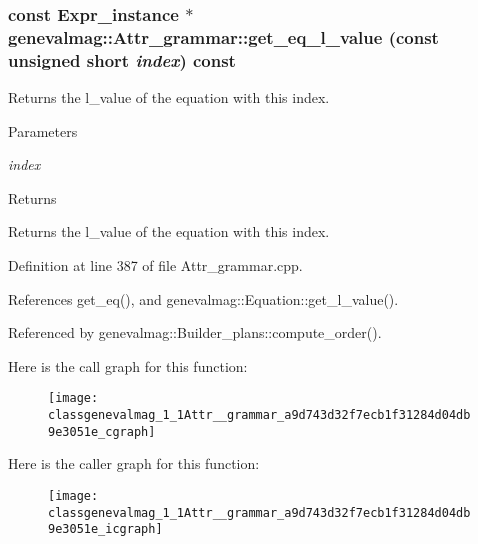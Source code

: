 \hypertarget{classgenevalmag_1_1Attr__grammar_a9d743d32f7ecb1f31284d04db9e3051e}{
\subsubsection[{get\_\-eq\_\-l\_\-value}]{\setlength{\rightskip}{0pt plus 5cm}const {\bf Expr\_\-instance} $\ast$ genevalmag::Attr\_\-grammar::get\_\-eq\_\-l\_\-value (const unsigned short {\em index}) const}}
\label{classgenevalmag_1_1Attr__grammar_a9d743d32f7ecb1f31284d04db9e3051e}
Returns the l\_\-value of the equation with this index. 
\begin{DoxyParams}{Parameters}
\item[{\em index}]\end{DoxyParams}
\begin{DoxyReturn}{Returns}

\end{DoxyReturn}
Returns the l\_\-value of the equation with this index. 

Definition at line 387 of file Attr\_\-grammar.cpp.



References get\_\-eq(), and genevalmag::Equation::get\_\-l\_\-value().



Referenced by genevalmag::Builder\_\-plans::compute\_\-order().



Here is the call graph for this function:\nopagebreak
\begin{figure}[H]
\begin{center}
\leavevmode
\texttt{[image: classgenevalmag\_1\_1Attr\_\_grammar\_a9d743d32f7ecb1f31284d04db9e3051e\_cgraph]}
\end{center}
\end{figure}




Here is the caller graph for this function:\nopagebreak
\begin{figure}[H]
\begin{center}
\leavevmode
\texttt{[image: classgenevalmag\_1\_1Attr\_\_grammar\_a9d743d32f7ecb1f31284d04db9e3051e\_icgraph]}
\end{center}
\end{figure}


